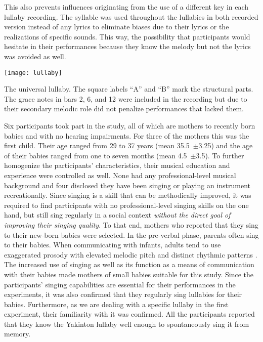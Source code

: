 This also prevents influences originating from the use of a different key in each lullaby recording.
The syllable \textipa{[na]} was used throughout the lullabies in both recorded version instead of any lyrics to eliminate biases due to their lyrics or the realizations of specific sounds.
This way, the possibility that participants would hesitate in their performances because they know the melody but not the lyrics was avoided as well.
%
\begin{snippet}[t]
	\centering
	\texttt{[image: lullaby]}
	\caption[Universal lullaby]
		{The universal lullaby.
		The square labels \enquote{A} and \enquote{B} mark the structural parts.
		The grace notes in bars 2, 6, and 12 were included in the recording but due to their secondary melodic role did not penalize performances that lacked them.}
	\label{snippet:uni-lullaby}
\end{snippet}

Six participants took part in the study, all of which are mothers to recently born babies and with no hearing impairments.
For three of the mothers this was the first child.
Their age ranged from 29 to 37 years (mean 35.5~$\pm$3.25) and the age of their babies ranged from one to seven months (mean 4.5~$\pm$3.5).
To further homogenize the participants' characteristics, their musical education and experience were controlled as well.
None had any professional-level musical background and four disclosed they have been singing or playing an instrument recreationally.
Since singing is a skill that can be methodically improved, it was required to find participants with no professional-level singing skills on the one hand, but still sing regularly in a social context \emph{without the direct goal of improving their singing quality}.
To that end, mothers who reported that they sing to their new-born babies were selected.
In the pre-verbal phase, parents often sing to their babies.
When communicating with infants, adults tend to use exaggerated prosody with elevated melodic pitch and distinct rhythmic patterns \citep{Fernald1991prosody}.
The increased use of singing as well as its function as a means of communication with their babies \citep[see][]{Street2003mothers,Papouvsek1991meanings} made mothers of small babies suitable for this study.
Since the participants' singing capabilities are essential for their performances in the experiments, it was also confirmed that they regularly sing lullabies for their babies.
Furthermore, as we are dealing with a specific lullaby in the first experiment, their familiarity with it was confirmed.
All the participants reported that they know the Yakinton lullaby well enough to spontaneously sing it from memory.

